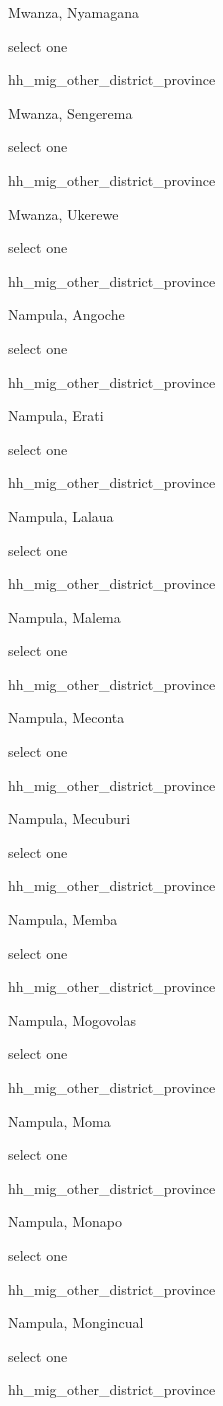 \documentclass[]{article}
\begin{document}
Mwanza, Nyamagana

select one

hh\_mig\_other\_district\_province

Mwanza, Sengerema

select one

hh\_mig\_other\_district\_province

Mwanza, Ukerewe

select one

hh\_mig\_other\_district\_province

Nampula, Angoche

select one

hh\_mig\_other\_district\_province

Nampula, Erati

select one

hh\_mig\_other\_district\_province

Nampula, Lalaua

select one

hh\_mig\_other\_district\_province

Nampula, Malema

select one

hh\_mig\_other\_district\_province

Nampula, Meconta

select one

hh\_mig\_other\_district\_province

Nampula, Mecuburi

select one

hh\_mig\_other\_district\_province

Nampula, Memba

select one

hh\_mig\_other\_district\_province

Nampula, Mogovolas

select one

hh\_mig\_other\_district\_province

Nampula, Moma

select one

hh\_mig\_other\_district\_province

Nampula, Monapo

select one

hh\_mig\_other\_district\_province

Nampula, Mongincual

select one

hh\_mig\_other\_district\_province
\end{document}
